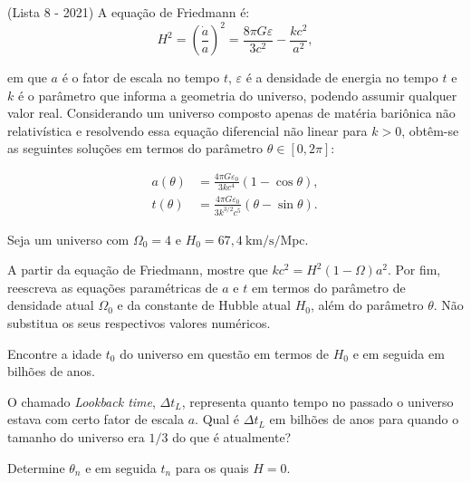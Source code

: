 \documentclass[11pt]{article}
\begin{document}
\begin{pproblem}(Lista 8 - 2021)
    A equação de Friedmann é:
\begin{equation}
    H^2 = \left( \frac{\dot{a}}{a} \right)^2 = \frac{8\pi G \varepsilon}{3c^2} - \frac{k c^2}{a^2},
\end{equation}

em que $a$ é o fator de escala no tempo $t$, $\varepsilon$ é a densidade de energia no tempo $t$ e $k$ é o parâmetro que informa a geometria do universo, podendo assumir qualquer valor real. Considerando um universo composto apenas de matéria bariônica não relativística e resolvendo essa equação diferencial não linear para $k > 0$, obtêm-se as seguintes soluções em termos do parâmetro $\theta \in [0, 2\pi]$:

\begin{align}
    a(\theta) &= \frac{4\pi G \varepsilon_0}{3k c^4} \left( 1 - \cos\theta \right), \\
    t(\theta) &= \frac{4\pi G \varepsilon_0}{3k^{3/2}c^5} \left( \theta - \sin\theta \right).
\end{align}

Seja um universo com $\Omega_0 = 4$ e $H_0 = 67,4 \ \text{km/s/Mpc}$.

\begin{alternativas}
    \item A partir da equação de Friedmann, mostre que $k c^2 = H^2 \left( 1 - \Omega \right) a^2$. Por fim, reescreva as equações paramétricas de $a$ e $t$ em termos do parâmetro de densidade atual $\Omega_0$ e da constante de Hubble atual $H_0$, além do parâmetro $\theta$. Não substitua os seus respectivos valores numéricos.
    \item Encontre a idade $t_0$ do universo em questão em termos de $H_0$ e em seguida em bilhões de anos.
    \item O chamado \textit{Lookback time}, $\Delta t_L$, representa quanto tempo no passado o universo estava com certo fator de escala $a$. Qual é $\Delta t_L$ em bilhões de anos para quando o tamanho do universo era $1/3$ do que é atualmente?
    \item Determine $\theta_n$ e em seguida $t_n$ para os quais $H = 0$.
\end{alternativas}
\begin{pssolution*}{}{}
    \begin{alternativas}
        \item 
    \end{alternativas}
    
\end{pssolution*}
\end{pproblem}
\end{document}
